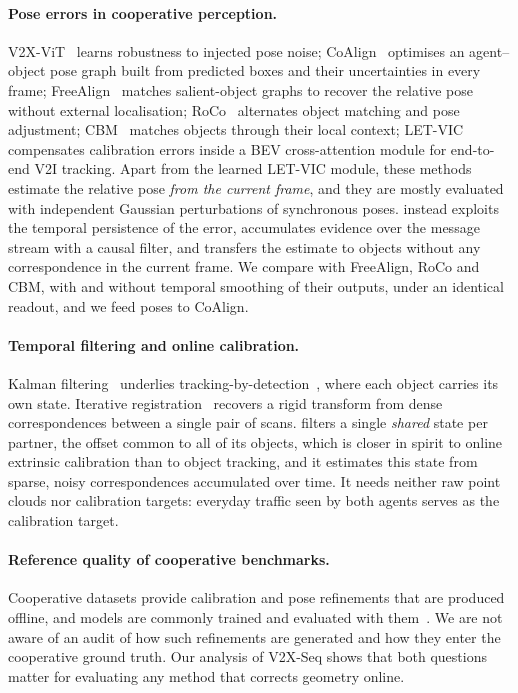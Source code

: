 \paragraph{Pose errors in cooperative perception.}
V2X-ViT~\cite{xu2022v2xvit} learns robustness to injected pose noise; CoAlign~\cite{lu2023coalign} optimises an agent--object pose graph built from predicted boxes and their uncertainties in every frame; FreeAlign~\cite{lei2024freealign} matches salient-object graphs to recover the relative pose without external localisation; RoCo~\cite{huang2024roco} alternates object matching and pose adjustment; CBM~\cite{song2023cbm} matches objects through their local context; LET-VIC~\cite{yang2024letvic} compensates calibration errors inside a BEV cross-attention module for end-to-end V2I tracking.
Apart from the learned LET-VIC module, these methods estimate the relative pose \emph{from the current frame}, and they are mostly evaluated with independent Gaussian perturbations of synchronous poses.
\method instead exploits the temporal persistence of the error, accumulates evidence over the message stream with a causal filter, and transfers the estimate to objects without any correspondence in the current frame.
We compare with FreeAlign, RoCo and CBM, with and without temporal smoothing of their outputs, under an identical readout, and we feed \method poses to CoAlign.

\paragraph{Temporal filtering and online calibration.}
Kalman filtering~\cite{kalman1960} underlies tracking-by-detection~\cite{weng2020ab3dmot,yin2021centerpoint}, where each object carries its own state. Iterative registration~\cite{besl1992icp} recovers a rigid transform from dense correspondences between a single pair of scans.
\method filters a single \emph{shared} state per partner, the offset common to all of its objects, which is closer in spirit to online extrinsic calibration than to object tracking, and it estimates this state from sparse, noisy correspondences accumulated over time.
It needs neither raw point clouds nor calibration targets: everyday traffic seen by both agents serves as the calibration target.

\paragraph{Reference quality of cooperative benchmarks.}
Cooperative datasets provide calibration and pose refinements that are produced offline, and models are commonly trained and evaluated with them~\cite{yu2022dairv2x,yu2023v2xseq,xu2023v2v4real}.
We are not aware of an audit of how such refinements are generated and how they enter the cooperative ground truth.
Our analysis of V2X-Seq shows that both questions matter for evaluating any method that corrects geometry online.
